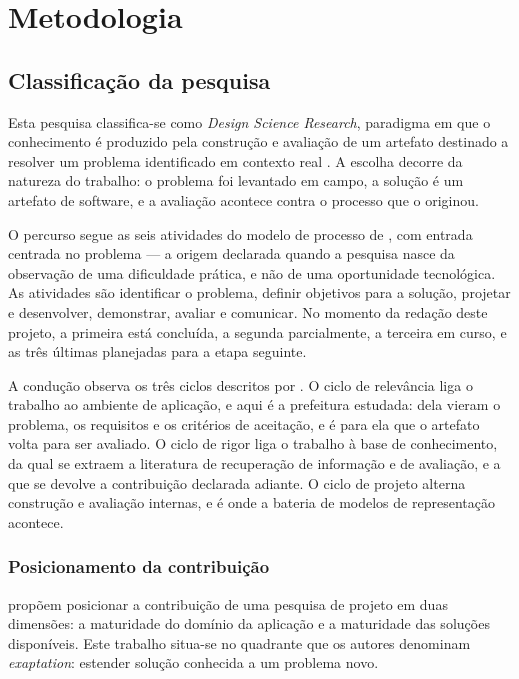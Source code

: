 \section{Metodologia}
\label{sec:metodologia}

\subsection{Classificação da pesquisa}
\label{subsec:classificacao}

Esta pesquisa classifica-se como \emph{Design Science Research}, paradigma em
que o conhecimento é produzido pela construção e avaliação de um artefato
destinado a resolver um problema identificado em contexto real
\cite{hevner2004design}. A escolha decorre da natureza do trabalho: o problema
foi levantado em campo, a solução é um artefato de software, e a avaliação
acontece contra o processo que o originou.

O percurso segue as seis atividades do modelo de processo de
, com entrada centrada no problema --- a origem
declarada quando a pesquisa nasce da observação de uma dificuldade prática, e
não de uma oportunidade tecnológica. As atividades são identificar o problema,
definir objetivos para a solução, projetar e desenvolver, demonstrar, avaliar e
comunicar. No momento da redação deste projeto, a primeira está concluída, a
segunda parcialmente, a terceira em curso, e as três últimas planejadas para a
etapa seguinte.

A condução observa os três ciclos descritos por . O
ciclo de relevância liga o trabalho ao ambiente de aplicação, e aqui é a
prefeitura estudada: dela vieram o problema, os requisitos e os critérios de
aceitação, e é para ela que o artefato volta para ser avaliado. O ciclo de rigor
liga o trabalho à base de conhecimento, da qual se extraem a literatura de
recuperação de informação e de avaliação, e a que se devolve a contribuição
declarada adiante. O ciclo de projeto alterna construção e avaliação internas,
e é onde a bateria de modelos de representação acontece.

\subsubsection{Posicionamento da contribuição}
\label{subsec:posicionamento}

 propõem posicionar a contribuição de uma
pesquisa de projeto em duas dimensões: a maturidade do domínio da aplicação e a
maturidade das soluções disponíveis. Este trabalho situa-se no quadrante que os
autores denominam \emph{exaptation}: estender solução conhecida a um problema
novo.

